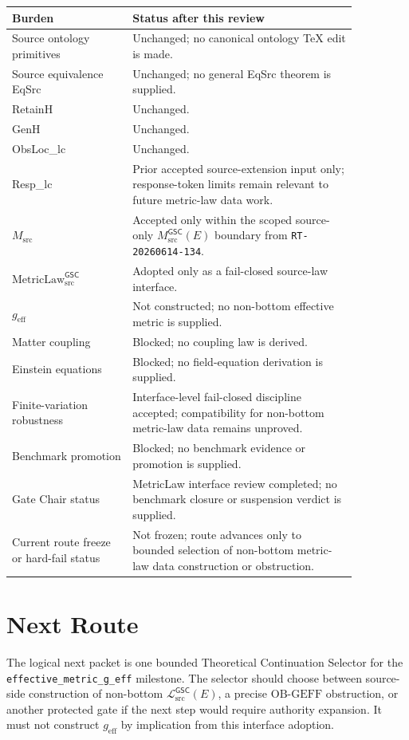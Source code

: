 \documentclass[11pt]{article}
\newcommand{\Msrc}{M_{\mathrm{src}}}
\newcommand{\MsrcGSC}{M_{\mathrm{src}}^{\mathsf{GSC}}}
\newcommand{\MetricLaw}{\mathrm{MetricLaw}_{\mathrm{src}}^{\mathsf{GSC}}}
\newcommand{\MetricData}{\mathcal{L}_{\mathrm{src}}^{\mathsf{GSC}}}
\newcommand{\geff}{g_{\mathrm{eff}}}
\begin{document}
\begin{longtable}{p{0.30\linewidth}p{0.56\linewidth}}
\toprule
Burden & Status after this review \\
\midrule
Source ontology primitives & Unchanged; no canonical ontology TeX edit is made. \\
Source equivalence EqSrc & Unchanged; no general EqSrc theorem is supplied. \\
RetainH & Unchanged. \\
GenH & Unchanged. \\
ObsLoc\_lc & Unchanged. \\
Resp\_lc & Prior accepted source-extension input only; response-token limits remain relevant to future metric-law data work. \\
\(\Msrc\) & Accepted only within the scoped source-only \(\MsrcGSC(E)\) boundary from \texttt{RT-20260614-134}. \\
\(\MetricLaw\) & Adopted only as a fail-closed source-law interface. \\
\(\geff\) & Not constructed; no non-bottom effective metric is supplied. \\
Matter coupling & Blocked; no coupling law is derived. \\
Einstein equations & Blocked; no field-equation derivation is supplied. \\
Finite-variation robustness & Interface-level fail-closed discipline accepted; compatibility for non-bottom metric-law data remains unproved. \\
Benchmark promotion & Blocked; no benchmark evidence or promotion is supplied. \\
Gate Chair status & MetricLaw interface review completed; no benchmark closure or suspension verdict is supplied. \\
Current route freeze or hard-fail status & Not frozen; route advances only to bounded selection of non-bottom metric-law data construction or obstruction. \\
\bottomrule
\end{longtable}

\section{Next Route}

The logical next packet is one bounded Theoretical Continuation Selector for
the \texttt{effective\_metric\_g\_eff} milestone. The selector should choose
between source-side construction of non-bottom \(\MetricData(E)\), a precise
\(\mathrm{OB\mbox{-}GEFF}\) obstruction, or another protected gate if the
next step would require authority expansion. It must not construct \(\geff\)
by implication from this interface adoption.
\end{document}
